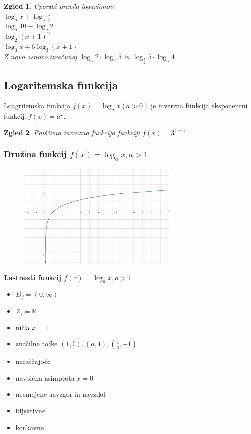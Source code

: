 \documentclass{article}
\newtheorem*{zgled}{Zgled}
\begin{document}
\begin{zgled}
    Uporabi pravila logaritmov:\\
    $\log_5 x +  \log_5 \frac{1}{x}$\\
    $\log_a 10 - \log_a 2$\\
    $\log_2 (x+1)^2$\\
    $\log_3 x + 6\log_3 (x+1)$\\
    Z novo osnovo izračunaj $\log_5 2 \cdot \log_2 5$ in $\log_{\frac{1}{2}}5\cdot \log_5 4$.
\end{zgled}

\subsection{Logaritemska funkcija}

Loagritemska funkcija $f(x)=\log_a x (a>0)$ je inverzna funkcija eksponentni funkciji $f(x)=a^x$.
\begin{zgled}
    Poiščimo inverzno funkcijo funkciji $f(x)=3^{\frac{x}{2}-1}$.\\
    
\end{zgled}

\subsubsection{Družina funkcij $f(x)=\log_a x, a>1$}

\begin{figure}[H]
\includegraphics[width=0.7\textwidth]{logaritm.pdf}
\centering
\end{figure}

\textbf{Lastnosti funkcij $f(x)=\log_a x, a>1$}
\begin{itemize}
    \item $D_f= (0,\infty)$
    \item $Z_f=\mathbb{R}$
    \item ničla $x=1$
    \item značilne točke $(1,0), (a,1), (\frac{1}{a},-1)$
    \item naraščajoče
    \item navpična asimptota $x=0$
    \item neomejene navzgor in navzdol
    \item bijektivne
    \item konkavne
\end{itemize}
\end{document}
